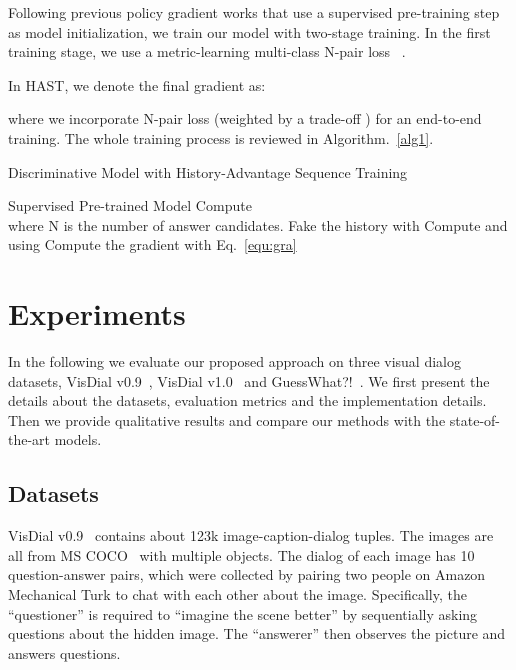 \documentclass[10pt,twocolumn,letterpaper]{article}
\begin{document}
Following previous policy gradient works that use a supervised pre-training step as model initialization, we train our model with two-stage training. In the first training stage, we use a metric-learning multi-class N-pair loss ~\cite{sohn2016improved,lu2017best}.

In HAST, we denote the final gradient as:


where we incorporate N-pair loss (weighted by a trade-off ) for an end-to-end training.
The whole training process is reviewed in Algorithm.~\ref{alg1}.

\begin{algorithm}
\caption{Discriminative Model with History-Advantage Sequence Training} 
\label{alg1}
\begin{algorithmic}[1]
\REQUIRE Supervised Pre-trained Model 
    \STATE Compute \\
    where N is the number of answer candidates.
    \FOR{}
        \FOR{}
            \STATE Fake the history  with 
            \STATE Compute  and  
            using 
\ENDFOR
    \ENDFOR
    \STATE Compute the gradient  with Eq.~\eqref{equ:gra}
    \STATE 
\ENDFOR
\end{algorithmic}
\end{algorithm}

\section{Experiments}\label{sec:5}
In the following we evaluate our proposed approach on three visual dialog datasets, VisDial v0.9~\cite{das2017visual}, VisDial v1.0~\cite{das2017visual} and GuessWhat?!~\cite{de2017guesswhat}. We first present the details about the datasets, evaluation metrics and the implementation details. Then we provide qualitative results and compare our methods with the state-of-the-art models.
\subsection{Datasets}
VisDial v0.9~\cite{das2017visual} contains about 123k image-caption-dialog
tuples. The images are all from MS COCO~\cite{lin2014microsoft} with multiple objects. The dialog of each image has 10 question-answer pairs, which were collected by pairing two people on Amazon Mechanical Turk to chat with each other about the image. Specifically, the ``questioner'' is required to ``imagine the scene better'' by sequentially asking questions about the hidden image. The ``answerer'' then observes the picture and answers questions. 
\end{document}
